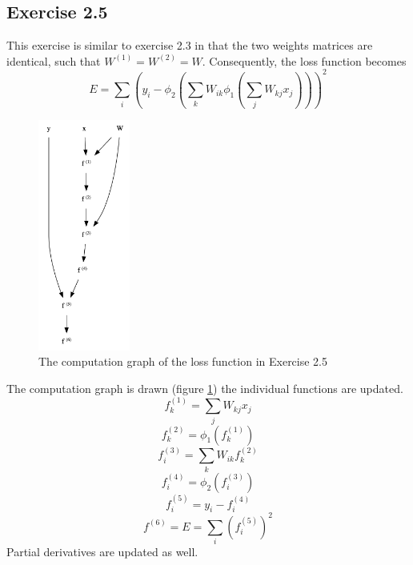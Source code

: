 \documentclass[fleqn]{report}
\begin{document}
\subsection*{Exercise 2.5}
This exercise is similar to exercise 2.3 in that the two weights matrices are identical, such that $W^{(1)} = W^{(2)} = W$. Consequently, the loss function becomes
\begin{equation}
    E=\sum_i \left ( y_i - \phi_2 \left ( \sum_k W_{ik} \phi_1 \left ( \sum_j W_{kj} x_j \right ) \right ) \right )^2
\end{equation}
\begin{figure}
    \centering
    \includegraphics[height=3in]{cg25.png}
    \caption{The computation graph of the loss function in Exercise 2.5}
    \label{fig:cg25}
\end{figure}
The computation graph is drawn (figure \ref{fig:cg25}) the individual functions are updated.
\begin{equation}
    f^{(1)}_k = \sum_j W_{kj} x_j
\end{equation}
\begin{equation}
    f^{(2)}_k = \phi_1 (f^{(1)}_k)
\end{equation}
\begin{equation}
    f^{(3)}_i = \sum_k W_{ik} f^{(2)}_k
\end{equation}
\begin{equation}
    f^{(4)}_i = \phi_2 (f^{(3)}_i)
\end{equation}
\begin{equation}
    f^{(5)}_i = y_i - f^{(4)}_i
\end{equation}
\begin{equation}
    f^{(6)} = E = \sum_i \left ( f^{(5)}_i \right )^2
\end{equation}
Partial derivatives are updated as well.
\end{document}
